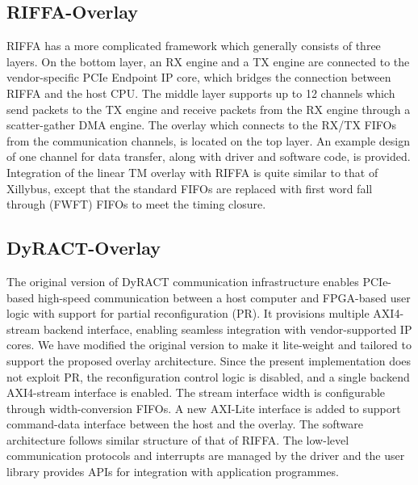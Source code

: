 \subsection{RIFFA-Overlay}
RIFFA has a more complicated framework which generally consists of three layers. 
On the bottom layer, an RX engine and a TX engine are connected to the vendor-specific PCIe Endpoint IP core, which bridges the connection between RIFFA and the host CPU. 
The middle layer supports up to 12 channels which send packets to the TX engine and receive packets from the RX engine through a scatter-gather DMA engine. 
The overlay which connects to the RX/TX FIFOs from the communication channels, is located on the top layer. 
An example design of one channel for data transfer, along with driver and software code, is provided. 
Integration of the linear TM overlay with RIFFA is quite similar to that of Xillybus, except
that the standard FIFOs are replaced with first word fall through (FWFT) FIFOs to meet the timing closure. 



\subsection{DyRACT-Overlay}
The original version of DyRACT communication infrastructure enables PCIe-based high-speed communication between a host computer and FPGA-based user logic with support for partial reconfiguration (PR). 
It provisions multiple AXI4-stream backend interface, enabling seamless integration with vendor-supported IP cores. 
We have modified the original version to make it lite-weight and tailored to support the proposed overlay architecture. 
Since the present implementation does not exploit PR, the reconfiguration control logic is disabled, and a single backend AXI4-stream interface is enabled. 
The stream interface width is configurable through width-conversion FIFOs. 
A new AXI-Lite interface is added to support command-data interface between the host and the overlay.
The software architecture follows similar structure of that of RIFFA. 
The low-level communication protocols and interrupts are managed by the driver and the user library provides APIs for integration with application programmes. 


